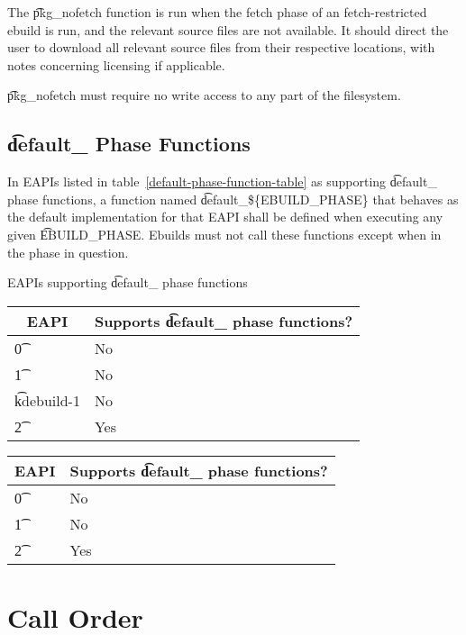 The \t{pkg\_nofetch} function is run when the fetch phase of an fetch-restricted ebuild is run, and
the relevant source files are not available. It should direct the user to download all relevant
source files from their respective locations, with notes concerning licensing if applicable.

\t{pkg\_nofetch} must require no write access to any part of the filesystem.

\subsection{\t{default\_} Phase Functions}

In EAPIs listed in table~\ref{default-phase-function-table} as supporting \t{default\_} phase
functions, a function named \t{default\_\$\{EBUILD\_PHASE\}} that behaves as the default
implementation for that EAPI shall be defined when executing any given \t{EBUILD\_PHASE}. Ebuilds
must not call these functions except when in the phase in question.

\begin{centertable}{EAPIs supporting \t{default\_} phase functions} \label{default-phase-function-table}
\IFKDEBUILDELSE
{
    \begin{tabular}{ l l }
        \toprule
            \multicolumn{1}{c}{\textbf{EAPI}} &
            \multicolumn{1}{c}{\textbf{Supports \t{default\_} phase functions?}} \\
            \midrule
    \t{0} & No \\
    \t{1} & No \\
    \t{kdebuild-1} & No \\
    \t{2} & Yes \\
    \bottomrule
    \end{tabular}
}{
    \begin{tabular}{ l l }
        \toprule
            \multicolumn{1}{c}{\textbf{EAPI}} &
            \multicolumn{1}{c}{\textbf{Supports \t{default\_} phase functions?}} \\
            \midrule
    \t{0} & No \\
    \t{1} & No \\
    \t{2} & Yes \\
    \bottomrule
    \end{tabular}
}
\end{centertable}

\section{Call Order}

